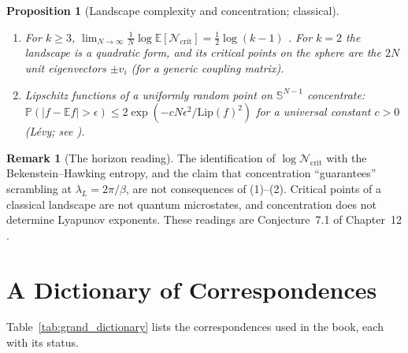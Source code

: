 \documentclass[11pt,a4paper,reqno]{amsart}
\newtheorem{proposition}[theorem]{Proposition}
\theoremstyle{definition}
\newtheorem{remark}[theorem]{Remark}
\numberwithin{equation}{section}
\providecommand{\Sph}{\mathbb{S}}
\begin{document}
\begin{proposition}[Landscape complexity and concentration; classical]
\label{thm:horizon_complexity}
\leavevmode
\begin{enumerate}
    \item For $k \ge 3$, $\lim_{N\to\infty}\frac1N\log\mathbb{E}[\mathcal{N}_{\mathrm{crit}}] = \frac12\log(k-1)$ \cite{auffinger2013random}. For $k = 2$ the landscape is a quadratic form, and its critical points on the sphere are the $2N$ unit eigenvectors $\pm v_i$ (for a generic coupling matrix).
    \item Lipschitz functions of a uniformly random point on $\Sph^{N-1}$ concentrate: $\mathbb{P}(|f - \mathbb{E} f| > \epsilon) \le 2\exp(-c N\epsilon^2/\mathrm{Lip}(f)^2)$ for a universal constant $c > 0$ (L\'evy; see \cite{ledoux2001}).
\end{enumerate}
\end{proposition}

\begin{remark}[The horizon reading]
The identification of $\log\mathcal{N}_{\mathrm{crit}}$ with the Bekenstein--Hawking entropy, and the claim that concentration ``guarantees'' scrambling at $\lambda_L = 2\pi/\beta$, are not consequences of (1)--(2). Critical points of a classical landscape are not quantum microstates, and concentration does not determine Lyapunov exponents. These readings are Conjecture~7.1 of Chapter~12 \cite{silvafilho2026grand}.
\end{remark}

\section{A Dictionary of Correspondences}
\label{sec:master_dictionary}

Table~\ref{tab:grand_dictionary} lists the correspondences used in the book, each with its status.
\end{document}
